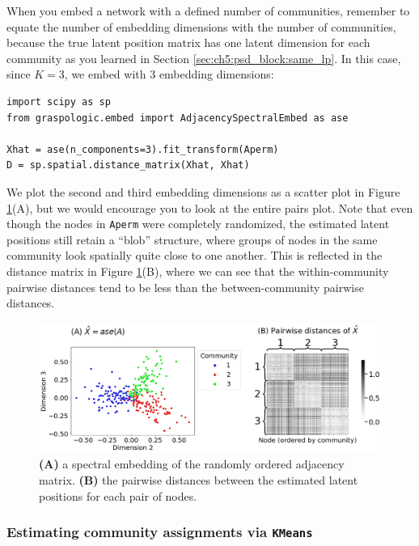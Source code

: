 When you embed a network with a defined number of communities, remember to equate the number of embedding dimensions with the number of communities, because the true latent position matrix has one latent dimension for each community as you learned in Section \ref{sec:ch5:psd_block:same_lp}. In this case, since $K=3$, we embed with $3$ embedding dimensions:

\begin{lstlisting}[style=python]
import scipy as sp
from graspologic.embed import AdjacencySpectralEmbed as ase

Xhat = ase(n_components=3).fit_transform(Aperm)
D = sp.spatial.distance_matrix(Xhat, Xhat)
\end{lstlisting}
We plot the second and third embedding dimensions as a scatter plot in Figure \ref{fig:ch7:comm_detect:embed}(A), but we would encourage you to look at the entire pairs plot. Note that even though the nodes in \texttt{Aperm} were completely randomized, the estimated latent positions still retain a ``blob'' structure, where groups of nodes in the same community look spatially quite close to one another. This is reflected in the distance matrix in Figure \ref{fig:ch7:comm_detect:embed}(B), where we can see that the within-community pairwise distances tend to be less than the between-community pairwise distances.


\begin{figure}[h]
    \centering
    \includegraphics[width=\linewidth]{applications/ch7/Images/comm_detect_embed.png}
    \caption[Community detection spectral embedding and pairwise distances]{\textbf{(A)} a spectral embedding of the randomly ordered adjacency matrix. \textbf{(B)} the pairwise distances between the estimated latent positions for each pair of nodes.}
    \label{fig:ch7:comm_detect:embed}
\end{figure}

\subsubsection{Estimating community assignments via \texttt{KMeans}}

